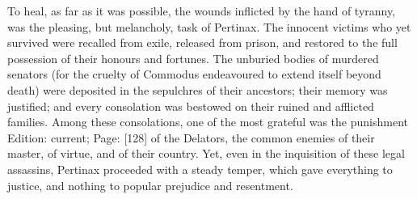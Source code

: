 To heal, as far as it was possible, the wounds inflicted by the hand of tyranny, was the pleasing, but melancholy, task of Pertinax. The innocent victims who yet survived were recalled from exile, released from prison, and restored to the full possession of their honours and fortunes. The unburied bodies of murdered senators (for the cruelty of Commodus endeavoured to extend itself beyond death) were deposited in the sepulchres of their ancestors; their memory was justified; and every consolation was bestowed on their ruined and afflicted families. Among these consolations, one of the most grateful was the punishment Edition: current; Page: [128] of the Delators, the common enemies of their master, of virtue, and of their country. Yet, even in the inquisition of these legal assassins, Pertinax proceeded with a steady temper, which gave everything to justice, and nothing to popular prejudice and resentment.


